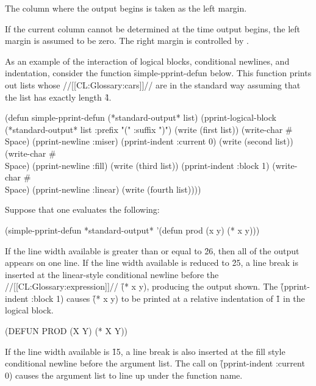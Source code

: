 The column where the output begins is taken as the left margin.





If the current column cannot be determined at the time output begins,
the left margin is assumed to be zero.
The right margin is controlled by .

\endsubsubsection%

\endsubSection%


As an example of the interaction of logical blocks, conditional newlines,
and indentation, consider the function \f{simple-pprint-defun} below.  This
function prints out lists whose //[[CL:Glossary:cars]]// are  in the 
standard way assuming that the list has exactly length \f{4}.
 
\code
(defun simple-pprint-defun (*standard-output* list)
  (pprint-logical-block (*standard-output* list :prefix "(" :suffix ")")
    (write (first list))
    (write-char #\\Space)
    (pprint-newline :miser)
    (pprint-indent :current 0)
    (write (second list))
    (write-char #\\Space)
    (pprint-newline :fill)
    (write (third list))
    (pprint-indent :block 1)
    (write-char #\\Space)
    (pprint-newline :linear)
    (write (fourth list))))
\endcode

Suppose that one evaluates the following:

\code
(simple-pprint-defun *standard-output* '(defun prod (x y) (* x y)))
\endcode
 
If the line width available is greater than or equal to \f{26}, then all of the
output appears on one line.  If the line width available is reduced to \f{25},
a line break is inserted at the 
linear-style conditional newline
before the
//[[CL:Glossary:expression]]// \f{(* x y)}, producing the output shown.  The
\f{(pprint-indent :block 1)} causes \f{(* x y)} to be printed at a relative
indentation of \f{1} in the logical block.
 
\code
 (DEFUN PROD (X Y) 
   (* X Y))
\endcode 

If the line width available is \f{15}, a line break is also inserted at the
fill style conditional newline before the argument list.  The call on
\f{(pprint-indent :current 0)} causes the argument list to line up under the
function name.
 
